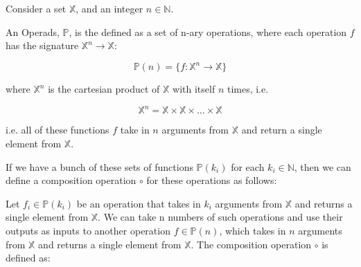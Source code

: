 Consider a set $\mathbb{X}$, and an integer $n \in \mathbb{N}$.

An Operads, $\mathbb{P}$, is the defined as a set of n-ary operations, where each operation $f$ has the signature $\mathbb{X}^n \to \mathbb{X}$:

\begin{equation}
  \mathbb{P}(n) = \{f: \mathbb{X}^n \to \mathbb{X}\}
\end{equation}

where $\mathbb{X}^n$ is the cartesian product of $\mathbb{X}$ with itself $n$ times, i.e.

\begin{equation}
  \mathbb{X}^n = \mathbb{X} \times \mathbb{X} \times \ldots \times \mathbb{X}
\end{equation}

i.e. all of these functions $f$ take in $n$ arguments from $\mathbb{X}$ and return a single element from $\mathbb{X}$.

\begin{figure}[h]
\centering
\end{figure}

If we have a bunch of these sets of functions $\mathbb{P}(k_i)$ for each $k_i \in \mathbb{N}$, then we can define a composition operation $\circ$ for these operations as follows:

Let $f_i \in \mathbb{P}(k_i)$ be an operation that takes in $k_i$ arguments from $\mathbb{X}$ and returns a single element from $\mathbb{X}$. We can take n numbers of such operations and use their outputs as inputs to another operation $f \in \mathbb{P}(n)$, which takes in $n$ arguments from $\mathbb{X}$ and returns a single element from $\mathbb{X}$. The composition operation $\circ$ is defined as:

